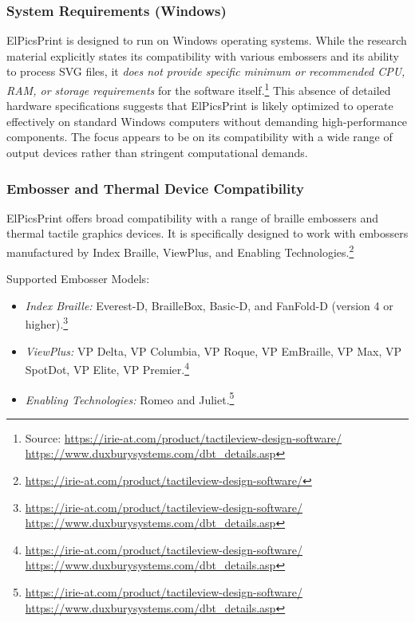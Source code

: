 \subsubsection{System Requirements (Windows)}

ElPicsPrint is designed to run on Windows operating systems. While the research material explicitly states its compatibility with various embossers and its ability to process SVG files, it \emph{does not provide specific minimum or recommended CPU, RAM, or storage requirements} for the software itself.\footnote{Source:  \url{https://irie-at.com/product/tactileview-design-software/} \url{https://www.duxburysystems.com/dbt_details.asp}} This absence of detailed hardware specifications suggests that ElPicsPrint is likely optimized to operate effectively on standard Windows computers without demanding high-performance components. The focus appears to be on its compatibility with a wide range of output devices rather than stringent computational demands.

\subsubsection{Embosser and Thermal Device Compatibility}

ElPicsPrint offers broad compatibility with a range of braille embossers and thermal tactile graphics devices. It is specifically designed to work with embossers manufactured by Index Braille, ViewPlus, and Enabling Technologies.\footnote{\url{https://irie-at.com/product/tactileview-design-software/}}

Supported Embosser Models:
\begin{itemize}
    \item \emph{Index Braille:} Everest-D, BrailleBox, Basic-D, and FanFold-D (version 4 or higher).\footnote{\url{https://irie-at.com/product/tactileview-design-software/} \url{https://www.duxburysystems.com/dbt_details.asp}}
    \item \emph{ViewPlus:} VP Delta, VP Columbia, VP Roque, VP EmBraille, VP Max, VP SpotDot, VP Elite, VP Premier.\footnote{\url{https://irie-at.com/product/tactileview-design-software/} \url{https://www.duxburysystems.com/dbt_details.asp}}
    \item \emph{Enabling Technologies:} Romeo and Juliet.\footnote{\url{https://irie-at.com/product/tactileview-design-software/} \url{https://www.duxburysystems.com/dbt_details.asp}}
\end{itemize}

